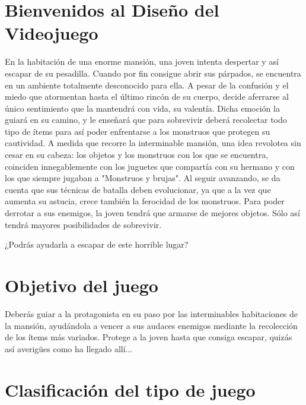 \section{Bienvenidos al Diseño del Videojuego}

En la habitación de una enorme mansión, una joven intenta despertar y así escapar de su pesadilla. Cuando por fin consigue abrir sus párpados, se encuentra en un ambiente totalmente desconocido para ella.
A pesar de la confusión y el miedo que atormentan hasta el último rincón de su cuerpo, decide aferrarse al único sentimiento que la mantendrá con vida, su valentía.\newline
\newline
Dicha emoción la guiará en su camino, y le enseñará que para sobrevivir deberá recolectar todo tipo de ítems para así poder enfrentarse a los monstruos que protegen su cautividad.
A medida que recorre la interminable mansión, una idea revolotea sin cesar en su cabeza: los objetos y los monstruos con los que se encuentra,  coinciden innegablemente con los juguetes que compartía con su hermano y con los que siempre jugaban a "Monstruos y brujas".\newline
\newline
Al seguir avanzando, se da cuenta que sus técnicas de batalla deben evolucionar, ya que a la vez que aumenta su astucia, crece también la ferocidad de los monstruos.
Para poder derrotar a sus enemigos, la joven tendrá que armarse de mejores objetos. Sólo así tendrá mayores posibilidades de sobrevivir.\newline
\newline

\centerline{¿Podrás ayudarla a escapar de este horrible lugar?}


\section{Objetivo del juego}

Deberás guiar a la protagonista en su paso por las interminables habitaciones de la mansión, ayudándola a vencer a sus audaces enemigos mediante la recolección de los ítems más variados.
Protege a la joven hasta que consiga escapar, quizás así averigües como ha llegado allí...

\section{Clasificación del tipo de juego}

